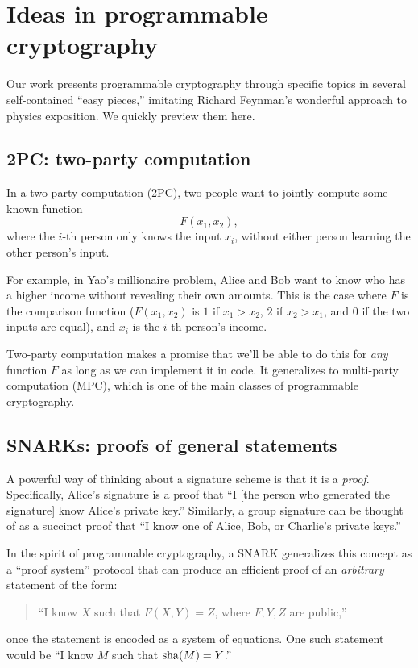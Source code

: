 \section{Ideas in programmable cryptography}

Our work presents programmable cryptography through specific topics in
several self-contained ``easy pieces,'' imitating Richard Feynman's
wonderful approach to physics exposition. We quickly preview them here.

\subsection{2PC: two-party computation}

In a \alert{two-party computation (2PC)}, two people want to jointly
compute some known function \[F ( x_{1},x_{2}),\] where the
$i$-th person only knows the input $x_{i}$, without either person
learning the other person's input.

For example, in Yao's millionaire problem, Alice and Bob want to know
who has a higher income without revealing their own amounts. This is the
case where $F$ is the comparison function
($F ( x_{1},x_{2} )$ is $1$ if $x_{1} > x_{2}$, $2$ if
$x_{2} > x_{1}$, and $0$ if the two inputs are equal), and $x_{i}$
is the $i$-th person's income.

Two-party computation makes a promise that we'll be able to do this
for \emph{any} function $F$ as long as we can implement it in code. It
generalizes to \alert{multi-party computation (MPC)}, which is one of the
main classes of programmable cryptography.

\subsection{SNARKs: proofs of general statements}

A powerful way of thinking about a signature scheme is that it is a
\emph{proof}. Specifically, Alice's signature is a proof that ``I
[the person who generated the signature] know Alice's private key.''
Similarly, a group signature can be thought of as a succinct proof that
``I know one of Alice, Bob, or Charlie's private keys.''

In the spirit of programmable cryptography, a \alert{SNARK} generalizes
this concept as a ``proof system'' protocol that can produce an efficient
proof of an \emph{arbitrary} statement of the form:
\begin{quote}
``I know $X$ such that $F(X,Y) = Z$, where $F,Y,Z$ are public,''
\end{quote}
once the statement is encoded as a system of equations. One such
statement would be ``I know $M$ such that
$\operatorname{sha}(M) = Y$.''

